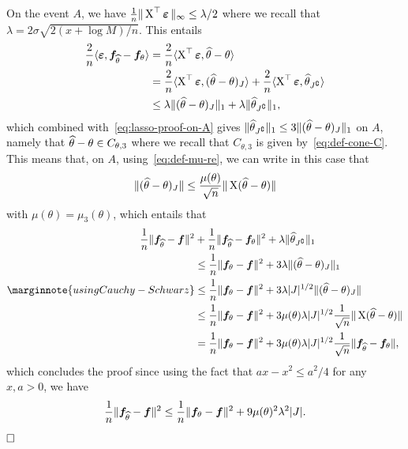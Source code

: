 On the event $A$,%
we have $\frac 1n \| \operatorname{{\boldsymbol X}}^\top \operatorname{\boldsymbol \varepsilon} \|_\infty \leq \lambda / 2$ where we recall that $\lambda = 2 \sigma \sqrt{2 (x + \log M) / n}$.
This entails 
\begin{align*}
	\frac 2n \langle \operatorname{\boldsymbol \varepsilon},  {\boldsymbol f}_{\widehat \theta} - {\boldsymbol f}_\theta \rangle &=
	\frac 2n \langle \operatorname{{\boldsymbol X}}^\top \operatorname{\boldsymbol \varepsilon}, \widehat \theta - \theta \rangle \\
	&= \frac 2n \langle \operatorname{{\boldsymbol X}}^\top \operatorname{\boldsymbol \varepsilon}, (\widehat \theta - \theta)_J \rangle 
	+ \frac 2n \langle \operatorname{{\boldsymbol X}}^\top \operatorname{\boldsymbol \varepsilon}, \widehat \theta_{J^\complement} \rangle \\
	&\leq \lambda \| (\widehat \theta - \theta)_J \|_1 
	+ \lambda \| \widehat \theta_{J^\complement} \|_1,
\end{align*}
which combined with~\eqref{eq:lasso-proof-on-A} gives $\| \widehat \theta_{J^\complement} \|_1 \leq 3 \| (\widehat \theta - \theta)_J \|_1$ on $A$, 
namely that $\widehat \theta - \theta \in C_{\theta, 3}$ where we recall that $C_{\theta, 3}$ is given by~\eqref{eq:def-cone-C}.
This means that, on $A$, using~\eqref{eq:def-mu-re}, we can write in this case that
\begin{equation*}
	\| (\widehat \theta - \theta)_J \| \leq \frac{\mu(\theta)}{\sqrt n} \| \operatorname{{\boldsymbol X}} (\widehat \theta - \theta) \|
\end{equation*}
with $\mu(\theta) = \mu_3(\theta)$, which entails that
\begin{align*}
	\frac 1n \norm{\bf_{\wh \theta} - \bf}^2 
	&+ \frac 1n \norm{\bf_{\wh \theta} - \bf_{\theta}}^2
	+ \lambda \norm{\wh \theta_{J^\complement}}_1 \\
	&\leq \frac 1n \norm{\bf_{\theta} - \bf}^2 
	+ 3 \lambda \norm{(\wh \theta - \theta)_J}_1 \\
	\marginnote{using Cauchy-Schwarz}
	&\leq \frac 1n \norm{\bf_{\theta} - \bf}^2 + 3 \lambda |J|^{1/2} \norm{(\wh \theta - \theta)_J} \\
	&\leq \frac 1n \norm{\bf_{\theta} - \bf}^2 + 3 \mu(\theta) \lambda |J|^{1/2} 
	\frac{1}{\sqrt n} \norm{\bX (\wh \theta - \theta)} \\
	&= \frac 1n \norm{\bf_{\theta} - \bf}^2 + 3 \mu(\theta) \lambda |J|^{1/2} 
	\frac{1}{\sqrt n} \norm{\bf_{\wh \theta} - \bf_\theta},
\end{align*}
which concludes the proof since using the fact that $ax - x^2 \leq a^2 / 4$ for any $x, a > 0$, we have
\begin{align*}
	\frac 1n \| {\boldsymbol f}_{\widehat \theta} - {\boldsymbol f} \|^2 
	\leq \frac 1n \| {\boldsymbol f}_{\theta} - {\boldsymbol f} \|^2 + 9 \mu(\theta)^2 \lambda^2 |J|.
\end{align*}
$\hfill \square$
